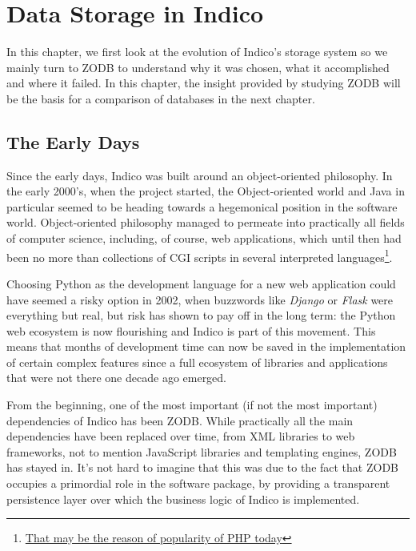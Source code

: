 \chapter{Data Storage in Indico}

\par In this chapter, we first look at the evolution of Indico's storage system so we mainly turn to \textsc{ZODB} to understand why it was chosen, what it accomplished and where it failed. In this chapter, the insight provided by studying ZODB will be the basis for a comparison of databases in the next chapter.

\section{The Early Days}

\par Since the early days, Indico was built around an object-oriented philosophy. In the early 2000's, when the project started, the Object-oriented world and Java in particular seemed to be heading towards a hegemonical position in the software world. Object-oriented philosophy managed to permeate into practically all fields of computer science, including, of course, web applications, which until then had been no more than collections of CGI scripts in several interpreted languages\footnote{\href{http://www.tiobe.com/index.php/content/paperinfo/tpci/index.html}{That may be the reason of popularity of PHP today}}.

\par Choosing Python as the development language for a new web application could have seemed a risky option in 2002, when buzzwords like \textit{Django} or \textit{Flask} were everything but real, but risk has shown to pay off in the long term: the Python web ecosystem is now flourishing and Indico is part of this movement. This means that months of development time can now be saved in the implementation of certain complex features since a full ecosystem of libraries and applications that were not there one decade ago emerged.

\par From the beginning, one of the most important (if not the most important) dependencies of Indico has been \textsc{ZODB}. While practically all the main dependencies have been replaced over time, from XML libraries to web frameworks, not to mention JavaScript libraries and templating engines, \textsc{ZODB} has stayed in. It's not hard to imagine that this was due to the fact that \textsc{ZODB} occupies a primordial role in the software package, by providing a transparent persistence layer over which the business logic of Indico is implemented.

